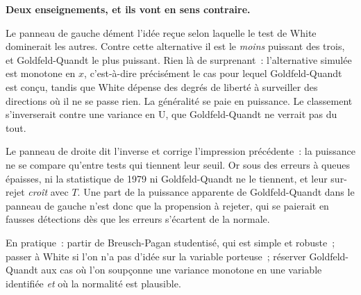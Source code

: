 \documentclass[10pt,a4paper]{article}
\theoremstyle{definition}
\begin{document}
\begin{notes}

  \textbf{Deux enseignements, et ils vont en sens contraire.}

  \bigskip

  Le panneau de gauche dément l'idée reçue selon laquelle le test de White
  dominerait les autres. Contre cette alternative il est le \emph{moins}
  puissant des trois, et Goldfeld-Quandt le plus puissant. Rien là de
  surprenant~: l'alternative simulée est monotone en $x$, c'est-à-dire
  précisément le cas pour lequel Goldfeld-Quandt est conçu, tandis que White
  dépense des degrés de liberté à surveiller des directions où il ne se passe
  rien. La généralité se paie en puissance. Le classement s'inverserait contre
  une variance en U, que Goldfeld-Quandt ne verrait pas du tout.

  \bigskip

  Le panneau de droite dit l'inverse et corrige l'impression précédente~: la
  puissance ne se compare qu'entre tests qui tiennent leur seuil. Or sous des
  erreurs à queues épaisses, ni la statistique de 1979 ni Goldfeld-Quandt ne le
  tiennent, et leur sur-rejet \emph{croît} avec $T$. Une part de la puissance
  apparente de Goldfeld-Quandt dans le panneau de gauche n'est donc que la
  propension à rejeter, qui se paierait en fausses détections dès que les
  erreurs s'écartent de la normale.

  \bigskip

  En pratique~: partir de Breusch-Pagan studentisé, qui est simple et robuste~;
  passer à White si l'on n'a pas d'idée sur la variable porteuse~; réserver
  Goldfeld-Quandt aux cas où l'on soupçonne une variance monotone en une
  variable identifiée \emph{et} où la normalité est plausible.

\end{notes}
\end{document}
